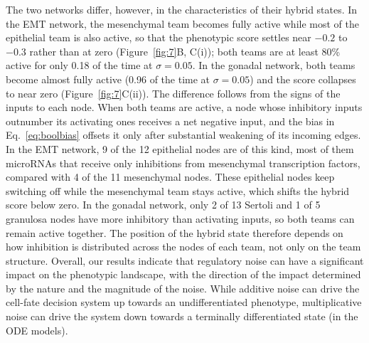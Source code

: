 \documentclass[11pt]{article}
\begin{document}
The two networks differ, however, in the characteristics of their hybrid states. In the EMT network, the mesenchymal team becomes fully active while most of the epithelial team is also active, so that the phenotypic score settles near $-0.2$ to $-0.3$ rather than at zero (Figure~\ref{fig:7}B, C(i)); both teams are at least 80\% active for only 0.18 of the time at $\sigma = 0.05$. In the gonadal network, both teams become almost fully active (0.96 of the time at $\sigma = 0.05$) and the score collapses to near zero (Figure~\ref{fig:7}C(ii)). %
The difference follows from the signs of the inputs to each node. When both teams are active, a node whose inhibitory inputs outnumber its activating ones receives a net negative input, and the bias in Eq.~\ref{eq:boolbias} offsets it only after substantial weakening of its incoming edges. In the EMT network, 9 of the 12 epithelial nodes are of this kind, most of them microRNAs that receive only inhibitions from mesenchymal transcription factors, compared with 4 of the 11 mesenchymal nodes. These epithelial nodes keep switching off while the mesenchymal team stays active, which shifts the hybrid score below zero. In the gonadal network, only 2 of 13 Sertoli and 1 of 5 granulosa nodes have more inhibitory than activating inputs, so both teams can remain active together. The position of the hybrid state therefore depends on how inhibition is distributed across the nodes of each team, not only on the team structure. Overall, our results indicate that regulatory noise can have a significant impact on the phenotypic landscape, with the direction of the impact determined by the nature and the magnitude of the noise. While additive noise can drive the cell-fate decision system up towards an undifferentiated phenotype, multiplicative noise can drive the system down towards a terminally differentiated state (in the ODE models). 
\end{document}
